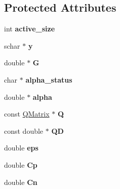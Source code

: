 \subsection*{Protected Attributes}
\begin{DoxyCompactItemize}
\item 
\hypertarget{class_solver_a06ba1b87b3749cc545e573151b7beca0}{
int {\bfseries active\_\-size}}
\label{class_solver_a06ba1b87b3749cc545e573151b7beca0}

\item 
\hypertarget{class_solver_a3acc1043d06dedf87f054ff3eea5c426}{
schar $\ast$ {\bfseries y}}
\label{class_solver_a3acc1043d06dedf87f054ff3eea5c426}

\item 
\hypertarget{class_solver_ad8ab27068f2e045591970aae1201afe9}{
double $\ast$ {\bfseries G}}
\label{class_solver_ad8ab27068f2e045591970aae1201afe9}

\item 
\hypertarget{class_solver_a9fe653e04c43956d5fb86635651b0003}{
char $\ast$ {\bfseries alpha\_\-status}}
\label{class_solver_a9fe653e04c43956d5fb86635651b0003}

\item 
\hypertarget{class_solver_a00d7a7cefa2504d41c7db6cd7cc6b428}{
double $\ast$ {\bfseries alpha}}
\label{class_solver_a00d7a7cefa2504d41c7db6cd7cc6b428}

\item 
\hypertarget{class_solver_a2d3461718f0570bdc47f5dfb31d61e0a}{
const \hyperlink{class_q_matrix}{QMatrix} $\ast$ {\bfseries Q}}
\label{class_solver_a2d3461718f0570bdc47f5dfb31d61e0a}

\item 
\hypertarget{class_solver_a7c7b7b1207983543855165e8eb249f2a}{
const double $\ast$ {\bfseries QD}}
\label{class_solver_a7c7b7b1207983543855165e8eb249f2a}

\item 
\hypertarget{class_solver_a718333cc2c1d40abf9c292a788cba1e5}{
double {\bfseries eps}}
\label{class_solver_a718333cc2c1d40abf9c292a788cba1e5}

\item 
\hypertarget{class_solver_a2e45dbea8be469bf8247e14768549dd5}{
double {\bfseries Cp}}
\label{class_solver_a2e45dbea8be469bf8247e14768549dd5}

\item 
\hypertarget{class_solver_a38d741d194839fb445f982dd78e0b97b}{
double {\bfseries Cn}}
\label{class_solver_a38d741d194839fb445f982dd78e0b97b}


\end{DoxyCompactItemize}
